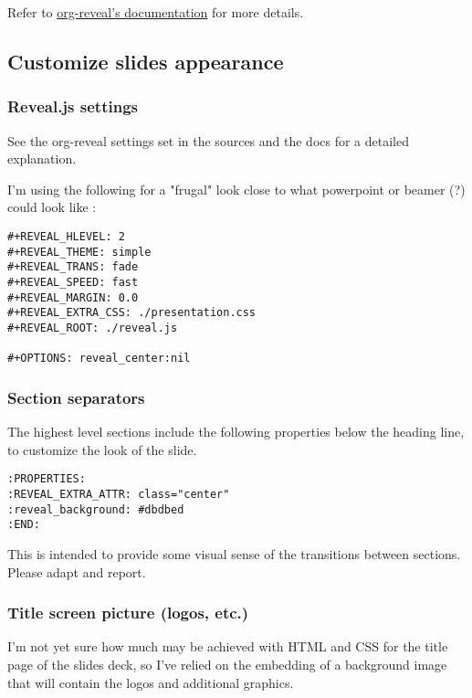 \documentclass[a4paper]{article}
\newenvironment{NOTES}{\begin{lrbox}{\mybox}\begin{minipage}{0.9\textwidth}\begin{shaded}}{\end{shaded}\end{minipage}\end{lrbox}\fbox{\usebox{\mybox}}}
\begin{document}
\begin{NOTES}
Refer to \href{https://github.com/yjwen/org-reveal/\#requirements-and-installation}{org-reveal's documentation} for more details.
\end{NOTES}

\subsection{Customize slides appearance}
\label{sec:org3b6eb9e}

\subsubsection{Reveal.js settings}
\label{sec:orgcc68bb7}

See the org-reveal settings set in the sources and the docs for a detailed explanation.

I'm using the following for a "frugal" look close to what
powerpoint or beamer (?) could look like :

\begin{verbatim}
#+REVEAL_HLEVEL: 2
#+REVEAL_THEME: simple
#+REVEAL_TRANS: fade
#+REVEAL_SPEED: fast
#+REVEAL_MARGIN: 0.0
#+REVEAL_EXTRA_CSS: ./presentation.css
#+REVEAL_ROOT: ./reveal.js

#+OPTIONS: reveal_center:nil 
\end{verbatim}

\subsubsection{Section separators}
\label{sec:org468ee93}

The highest level sections include the following properties below the heading line, to customize the look of the slide. 

\begin{verbatim}
:PROPERTIES:
:REVEAL_EXTRA_ATTR: class="center"
:reveal_background: #dbdbed
:END:
\end{verbatim}

This is intended to provide some visual sense of the transitions between sections. Please adapt and report.

\subsubsection{Title screen picture (logos, etc.)}
\label{sec:orge34c314}

I'm not yet sure how much may be achieved with HTML and CSS for the
title page of the slides deck, so I've relied on the embedding of a
background image that will contain the logos and additional graphics. 
\end{document}
